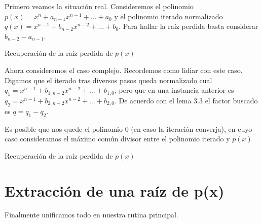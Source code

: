 \documentclass[oneside,11pt]{book}
\theoremstyle{definition}
\theoremstyle{plain}
\theoremstyle{remark}
\begin{document}
Primero veamos la situaci\'on real. 
Consideremos el polinomio $p(x)=x^n+a_{n-1}x^{n-1}+\dots+a_0$ y 
el polinomio iterado normalizado $q(x)=x^{n-1}+b_{n-2}x^{n-2}+\dots+b_0$. 
Para hallar la ra\'iz perdida basta considerar $b_{n-2}-a_{n-1}$.

\begin{algorithm}[H]
 \caption{Recuperaci\'on de la ra\'iz perdida de $p(x)$}
 
  \SetAlgoLined\DontPrintSemicolon
\medskip

\end{algorithm}
\bigskip

Ahora consideremos el caso complejo.
Recordemos como lidiar con este caso.
Digamos que el iterado tras diversos pasos  queda normalizado  cual 
$q_1=x^{n-1}+b_{1,n-2}x^{n-2}+\dots+b_{1,0}$, 
pero que en una instancia anterior es $q_2=x^{n-1}+b_{2,n-2}x^{n-2}+\dots+b_{2,0}$.
De acuerdo con el lema 3.3 el factor buscado es $q=q_1-q_2$. 

Es posible que nos quede el polinomio $0$ (en caso la iteraci\'on converja), 
en cuyo caso consideramos el m\'aximo com\'un divisor entre el polinomio iterado y $p(x)$

\begin{algorithm}[H]
 \caption{Recuperaci\'on de la ra\'iz perdida de $p(x)$}
 
  \SetAlgoLined\DontPrintSemicolon
\medskip
\end{algorithm}

\section{Extracci\'on de una ra\'iz de p(x)}

Finalmente unificamos todo en nuestra rutina principal. 
\medskip
\end{document}
